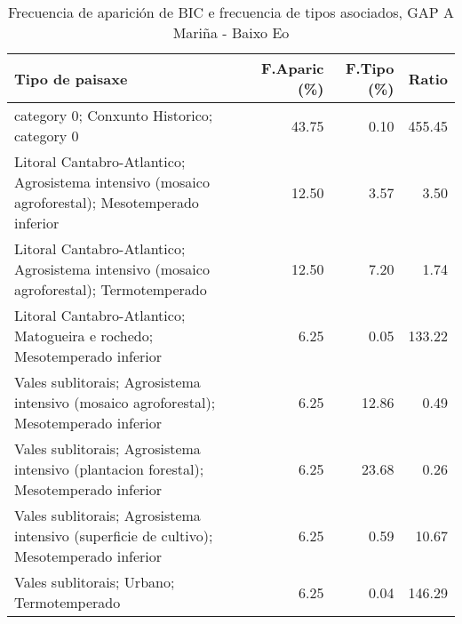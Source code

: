 \begin{table}[p]
\centering
\caption{Frecuencia de aparición de BIC e frecuencia de tipos asociados, GAP A Mariña - Baixo Eo} 
\label{vbic2}
\begin{tabular}{lrrr}
  \hline
Tipo de paisaxe & F.Aparic (\%) & F.Tipo (\%) & Ratio \\ 
  \hline
category 0; Conxunto Historico; category 0 & 43.75 & 0.10 & 455.45 \\ 
  Litoral Cantabro-Atlantico; Agrosistema intensivo (mosaico agroforestal); Mesotemperado inferior & 12.50 & 3.57 & 3.50 \\ 
  Litoral Cantabro-Atlantico; Agrosistema intensivo (mosaico agroforestal); Termotemperado & 12.50 & 7.20 & 1.74 \\ 
  Litoral Cantabro-Atlantico; Matogueira e rochedo; Mesotemperado inferior & 6.25 & 0.05 & 133.22 \\ 
  Vales sublitorais; Agrosistema intensivo (mosaico agroforestal); Mesotemperado inferior & 6.25 & 12.86 & 0.49 \\ 
  Vales sublitorais; Agrosistema intensivo (plantacion forestal); Mesotemperado inferior & 6.25 & 23.68 & 0.26 \\ 
  Vales sublitorais; Agrosistema intensivo (superficie de cultivo); Mesotemperado inferior & 6.25 & 0.59 & 10.67 \\ 
  Vales sublitorais; Urbano; Termotemperado & 6.25 & 0.04 & 146.29 \\ 
   \hline
\end{tabular}
\end{table}
